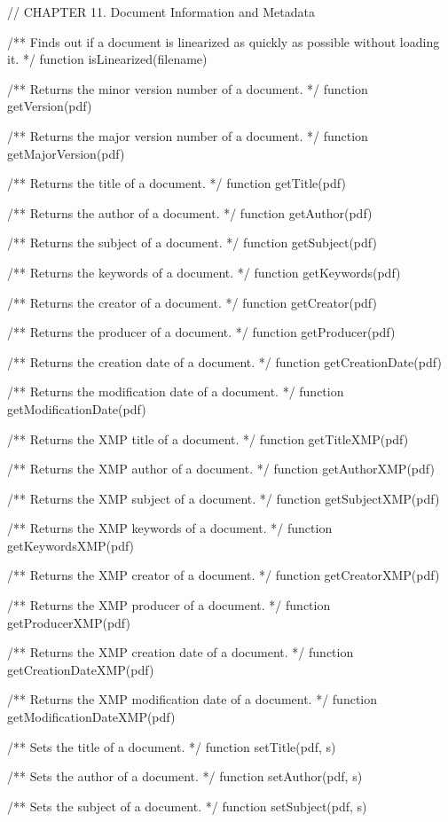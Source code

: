 // CHAPTER 11. Document Information and Metadata

/** Finds out if a document is linearized as quickly as possible without
loading it. */
function isLinearized(filename)

/** Returns the minor version number of a document. */
function getVersion(pdf)

/** Returns the major version number of a document. */
function getMajorVersion(pdf)

/** Returns the title of a document. */
function getTitle(pdf)

/** Returns the author of a document. */
function getAuthor(pdf)

/** Returns the subject of a document. */
function getSubject(pdf)

/** Returns the keywords of a document. */
function getKeywords(pdf)

/** Returns the creator of a document. */
function getCreator(pdf)

/** Returns the producer of a document. */
function getProducer(pdf)

/** Returns the creation date of a document. */
function getCreationDate(pdf)

/** Returns the modification date of a document. */
function getModificationDate(pdf)

/** Returns the XMP title of a document. */
function getTitleXMP(pdf)

/** Returns the XMP author of a document. */
function getAuthorXMP(pdf)

/** Returns the XMP subject of a document. */
function getSubjectXMP(pdf)

/** Returns the XMP keywords of a document. */
function getKeywordsXMP(pdf)

/** Returns the XMP creator of a document. */
function getCreatorXMP(pdf)

/** Returns the XMP producer of a document. */
function getProducerXMP(pdf)

/** Returns the XMP creation date of a document. */
function getCreationDateXMP(pdf)

/** Returns the XMP modification date of a document. */
function getModificationDateXMP(pdf)

/** Sets the title of a document. */
function setTitle(pdf, s)

/** Sets the author of a document. */
function setAuthor(pdf, s)

/** Sets the subject of a document. */
function setSubject(pdf, s)

